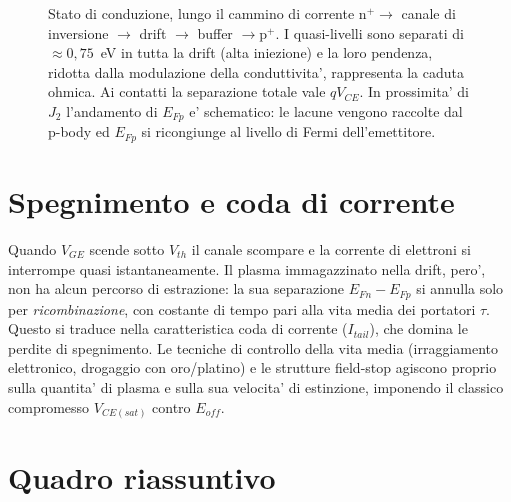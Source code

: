 \begin{figure}[H]
\caption{Stato di conduzione, lungo il cammino di corrente
$\mathrm{n^{+}}\!\to$ canale di inversione $\to$ drift $\to$ buffer $\to
\mathrm{p^{+}}$. I quasi-livelli sono separati di $\approx 0{,}75$~eV in tutta
la drift (alta iniezione) e la loro pendenza, ridotta dalla modulazione della
conduttivita', rappresenta la caduta ohmica. Ai contatti la separazione totale
vale $qV_{CE}$. In prossimita' di $J_2$ l'andamento di $E_{Fp}$ e' schematico:
le lacune vengono raccolte dal p-body ed $E_{Fp}$ si ricongiunge al livello di
Fermi dell'emettitore.}
\label{igbtfermi:fig:on}
\end{figure}

\section{Spegnimento e coda di corrente}

Quando $V_{GE}$ scende sotto $V_{th}$ il canale scompare e la corrente di
elettroni si interrompe quasi istantaneamente. Il plasma immagazzinato nella
drift, pero', non ha alcun percorso di estrazione: la sua separazione
$E_{Fn}-E_{Fp}$ si annulla solo per \emph{ricombinazione}, con costante di
tempo pari alla vita media dei portatori $\tau$. Questo si traduce nella
caratteristica coda di corrente ($I_{tail}$), che domina le perdite di
spegnimento. Le tecniche di controllo della vita media (irraggiamento
elettronico, drogaggio con oro/platino) e le strutture field-stop agiscono
proprio sulla quantita' di plasma e sulla sua velocita' di estinzione,
imponendo il classico compromesso $V_{CE(sat)}$ contro $E_{off}$.

\section{Quadro riassuntivo}

